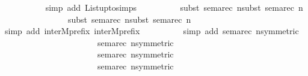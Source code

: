 \begin{isabellebody}
\ \ \ \ \ \ \ \ \ \isamarkupfalse%
{\isacharparenleft}{\kern0pt}simp\ add{\isacharcolon}{\kern0pt}\ List{\isachardot}{\kern0pt}upto{\isachardot}{\kern0pt}simps{\isacharparenright}{\kern0pt}\isanewline
\ \ \ \ \ \ \ \ \ \isamarkupfalse%
{\isacharparenleft}{\kern0pt}subst\ sema{\isacharunderscore}{\kern0pt}rec{\isacharbrackleft}{\kern0pt}\ n{\isacharequal}{\kern0pt}{\isacartoucheopen}{}{\isacartoucheclose}{\isacharbrackright}{\kern0pt}{\isacharcomma}{\kern0pt}subst\ sema{\isacharunderscore}{\kern0pt}rec{\isacharbrackleft}{\kern0pt}\ n{\isacharequal}{\kern0pt}{\isacartoucheopen}{}{\isacartoucheclose}{\isacharbrackright}{\kern0pt}{\isacharcomma}{\kern0pt}\isanewline
\ \ \ \ \ \ \ \ \ \ \ \ \ \ \ subst\ sema{\isacharunderscore}{\kern0pt}rec{\isacharbrackleft}{\kern0pt}\ n{\isacharequal}{\kern0pt}{\isacartoucheopen}{}{\isacartoucheclose}{\isacharbrackright}{\kern0pt}{\isacharcomma}{\kern0pt}subst\ sema{\isacharunderscore}{\kern0pt}rec{\isacharbrackleft}{\kern0pt}\ n{\isacharequal}{\kern0pt}{\isacartoucheopen}{}{\isacartoucheclose}{\isacharbrackright}{\kern0pt}{\isacharparenright}{\kern0pt}\ \isanewline
\ \ \ \ \ \ \ \ \ \isamarkupfalse%
{\isacharparenleft}{\kern0pt}simp\ add{\isacharcolon}{\kern0pt}\ inter{}Mprefix{}\ inter{}Mprefix{}{\isacharparenright}{\kern0pt}\isanewline
\ \ \ \ \ \ \ \ \ \isamarkupfalse%
{\isacharparenleft}{\kern0pt}simp\ add{\isacharcolon}{\kern0pt}\ sema{\isacharunderscore}{\kern0pt}rec{\isacharbrackleft}{\kern0pt}\ n{\isacharequal}{\kern0pt}{\isacartoucheopen}{}{\isacartoucheclose}{\isacharcomma}{\kern0pt}symmetric{\isacharbrackright}{\kern0pt}\ \isanewline
\ \ \ \ \ \ \ \ \ \ \ \ \ \ \ \ \ \ \ \ \ \ sema{\isacharunderscore}{\kern0pt}rec{\isacharbrackleft}{\kern0pt}\ n{\isacharequal}{\kern0pt}{\isacartoucheopen}{}{\isacartoucheclose}{\isacharcomma}{\kern0pt}symmetric{\isacharbrackright}{\kern0pt}\ \isanewline
\ \ \ \ \ \ \ \ \ \ \ \ \ \ \ \ \ \ \ \ \ \ sema{\isacharunderscore}{\kern0pt}rec{\isacharbrackleft}{\kern0pt}\ n{\isacharequal}{\kern0pt}{\isacartoucheopen}{}{\isacartoucheclose}{\isacharcomma}{\kern0pt}symmetric{\isacharbrackright}{\kern0pt}\ \isanewline
\ \ \ \ \ \ \ \ \ \ \ \ \ \ \ \ \ \ \ \ \ \ sema{\isacharunderscore}{\kern0pt}rec{\isacharbrackleft}{\kern0pt}\ n{\isacharequal}{\kern0pt}{\isacartoucheopen}{}{\isacartoucheclose}{\isacharcomma}{\kern0pt}symmetric{\isacharbrackright}{\kern0pt}\ \isanewline

\end{isabellebody}
